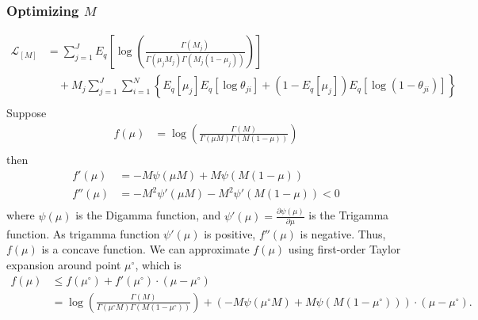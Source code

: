 \documentclass[11pt,reqno]{amsart}
\begin{document}
\subsubsection{Optimizing $ M $}
\begin{equation}
\begin{split}
\label{M}
\mathcal{L}_{{[M]}}
&= \sum_{j=1}^{J} E_q  \left[ \log \left( \frac{ \Gamma(M_j) } { \Gamma(\mu_j M_j) \Gamma(M_j (1-\mu_j)) }\right) \right] \\
&\quad + M_j \sum_{j=1}^{J} \sum_{i=1}^{N} \left\lbrace E_q \left[ \mu_j \right] E_q \left[ \log \theta_{ji} \right] + \left( 1 - E_q\left[ \mu_j \right]  \right) E_q\left[ \log \left( 1 - \theta_{ji}\right) \right] \right\rbrace \\
\end{split}
\end{equation}
Suppose
\begin{equation}
\begin{split}
f(\mu) &= \log\left( \frac{\Gamma(M)}{\Gamma(\mu M) \Gamma(M (1-\mu ))}\right) \nonumber \\
\end{split}
\end{equation}
then
\begin{align}
f'(\mu) &= -M \psi (\mu M) + M \psi(M (1-\mu )) \nonumber \\
f''(\mu) &= -M^2 \psi ' (\mu M) - M^2 \psi '(M (1-\mu )) <0 \nonumber \\
\end{align}
where $ \psi(\mu) $ is the Digamma function, and $ \psi'(\mu)= \frac{\partial \psi(\mu)}{\partial \mu}$ is the Trigamma function. As trigamma function $ \psi'(\mu) $ is positive, $ f''(\mu) $ is negative. Thus, $ f(\mu) $ is a concave function. We can approximate $ f(\mu) $ using first-order Taylor expansion around point $ \mu^{\circ} $, which is
\begin{equation}
\begin{split}
f(\mu) &\leq f(\mu^{\circ}) + f'(\mu^{\circ}) \cdot (\mu-\mu^{\circ}) \nonumber \\
&= \log\left( \frac{\Gamma(M)}{\Gamma(\mu^{\circ} M) \Gamma(M (1-\mu^{\circ} ))}\right) + \left( -M \psi (\mu^{\circ} M) + M \psi(M (1-\mu^{\circ} ))\right) \cdot (\mu-\mu^{\circ}).
\end{split}
\end{equation}
\end{document}
